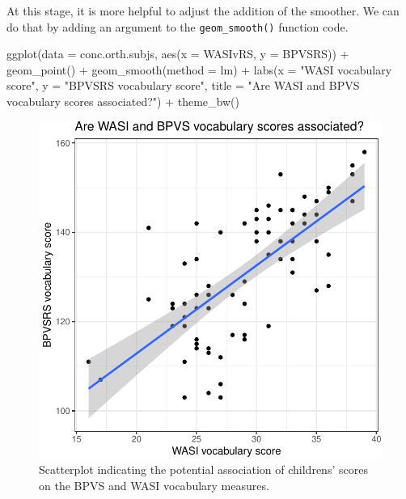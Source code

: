 \documentclass[
  letterpaper,
  DIV=11,
  numbers=noendperiod]{scrreprt}
\newenvironment{Shaded}{\begin{snugshade}}{\end{snugshade}}
\newcommand{\AttributeTok}[1]{\textcolor[rgb]{0.40,0.45,0.13}{#1}}
\newcommand{\FunctionTok}[1]{\textcolor[rgb]{0.28,0.35,0.67}{#1}}
\newcommand{\NormalTok}[1]{\textcolor[rgb]{0.00,0.23,0.31}{#1}}
\newcommand{\SpecialCharTok}[1]{\textcolor[rgb]{0.37,0.37,0.37}{#1}}
\newcommand{\StringTok}[1]{\textcolor[rgb]{0.13,0.47,0.30}{#1}}
\begin{document}
At this stage, it is more helpful to adjust the addition of the
smoother. We can do that by adding an argument to the
\texttt{geom\_smooth()} function code.

\begin{Shaded}
\begin{Highlighting}[numbers=left,,]
\FunctionTok{ggplot}\NormalTok{(}\AttributeTok{data =}\NormalTok{ conc.orth.subjs, }\FunctionTok{aes}\NormalTok{(}\AttributeTok{x =}\NormalTok{ WASIvRS, }\AttributeTok{y =}\NormalTok{ BPVSRS)) }\SpecialCharTok{+}
  \FunctionTok{geom\_point}\NormalTok{() }\SpecialCharTok{+}
  \FunctionTok{geom\_smooth}\NormalTok{(}\AttributeTok{method =} \StringTok{\textquotesingle{}lm\textquotesingle{}}\NormalTok{) }\SpecialCharTok{+}
  \FunctionTok{labs}\NormalTok{(}\AttributeTok{x =} \StringTok{"WASI vocabulary score"}\NormalTok{, }
       \AttributeTok{y =} \StringTok{"BPVSRS vocabulary score"}\NormalTok{,}
       \AttributeTok{title =} \StringTok{"Are WASI and BPVS vocabulary scores associated?"}\NormalTok{) }\SpecialCharTok{+}
  \FunctionTok{theme\_bw}\NormalTok{()}
\end{Highlighting}
\end{Shaded}

\begin{figure}[H]

{\centering \includegraphics{visualization_files/figure-pdf/fig-scatter-BPVS-WASI-lm-1.pdf}

}

\caption{\label{fig-scatter-BPVS-WASI-lm}Scatterplot indicating the
potential association of childrens' scores on the BPVS and WASI
vocabulary measures.}

\end{figure}
\end{document}

